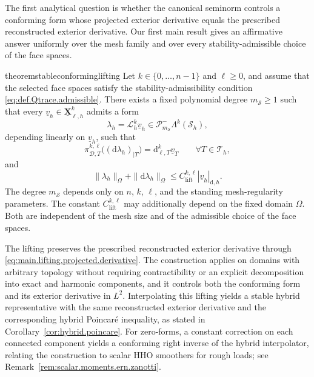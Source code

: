 \documentclass[a4paper,11pt]{article}
\theoremstyle{definition}
\newcommand{\DIFF}{\mathrm{d}}
\newcommand{\Sh}{\mathcal{S}_h}
\newcommand{\PLtrim}[2]{\mathcal{P}_{#1}^{-}\Lambda^{#2}}
\newcommand{\uXh}[1]{\underline{\boldsymbol{X}}_{\ell,h}^{#1}}
\newcommand{\piD}[2]{\pi_{\mathcal D,#1}^{#2,\ell}}
\begin{document}
The first analytical question is whether the canonical seminorm controls a conforming form whose projected exterior derivative equals the prescribed reconstructed exterior derivative.
Our first main result gives an affirmative answer uniformly over the mesh family and over every stability-admissible choice of the face spaces.

\begin{restatable}{theorem}{stableconforminglifting}
\label{thm:main.hybrid.poincare}
Let $k\in\{0,\ldots,n-1\}$ and $\ell\geq0$, and assume that the selected face spaces satisfy the stability-admissibility condition \eqref{eq:def.Qtrace.admissible}.
There exists a fixed polynomial degree $m_{\mathcal S}\geq1$ such that every $\underline v_h\in\uXh{k}$ admits a form
\[
  \lambda_h=\mathcal L_h^k\underline v_h
  \in \PLtrim{m_{\mathcal S}}{k}(\Sh),
\]
depending linearly on $\underline v_h$, such that
\begin{equation}\label{eq:main.lifting.projected.derivative}
  \piD{T}{k}\bigl((\DIFF\lambda_h)_{|T}\bigr)
  =\DIFF_{\ell,T}^{k}\underline v_T
  \qquad\forall T\in\mathcal T_h,
\end{equation}
and
\begin{equation}\label{eq:main.lifting.stability}
  \|\lambda_h\|_\Omega+\|\DIFF\lambda_h\|_\Omega
  \leq C_{\mathrm{lift}}^{k,\ell}|\underline v_h|_{\DIFF,h}.
\end{equation}
The degree $m_{\mathcal S}$ depends only on $n$, $k$, $\ell$, and the standing mesh-regularity parameters.
The constant $C_{\mathrm{lift}}^{k,\ell}$ may additionally depend on the fixed domain $\Omega$.
Both are independent of the mesh size and of the admissible choice of the face spaces.
\end{restatable}

The lifting preserves the prescribed reconstructed exterior derivative through \eqref{eq:main.lifting.projected.derivative}.
The construction applies on domains with arbitrary topology without requiring contractibility or an explicit decomposition into exact and harmonic components, and it controls both the conforming form and its exterior derivative in $L^2$.
Interpolating this lifting yields a stable hybrid representative with the same reconstructed exterior derivative and the corresponding hybrid Poincar\'e inequality, as stated in Corollary~\ref{cor:hybrid.poincare}.
For zero-forms, a constant correction on each connected component yields a conforming right inverse of the hybrid interpolator, relating the construction to scalar HHO smoothers for rough loads; see Remark~\ref{rem:scalar.moments.ern.zanotti}.
\end{document}
